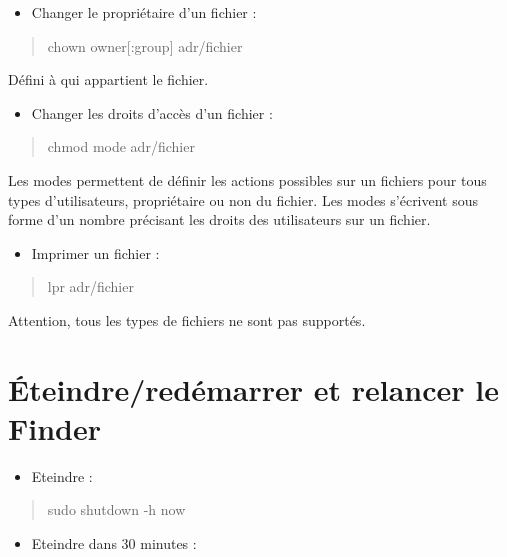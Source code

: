 \begin{itemize}
\tightlist
\item
  Changer le propriétaire d'un fichier :
\end{itemize}

\begin{quote}
chown owner{[}:group{]} adr/fichier
\end{quote}

Défini à qui appartient le fichier.

\begin{itemize}
\tightlist
\item
  Changer les droits d'accès d'un fichier :
\end{itemize}

\begin{quote}
chmod mode adr/fichier
\end{quote}

Les modes permettent de définir les actions possibles sur un fichiers
pour tous types d'utilisateurs, propriétaire ou non du fichier. Les
modes s'écrivent sous forme d'un nombre précisant les droits des
utilisateurs sur un fichier.

\begin{itemize}
\tightlist
\item
  Imprimer un fichier :
\end{itemize}

\begin{quote}
lpr adr/fichier
\end{quote}

Attention, tous les types de fichiers ne sont pas supportés.

\section{Éteindre/redémarrer et relancer le
Finder}\label{uxe9teindrereduxe9marrer-et-relancer-le-finder}

\begin{itemize}
\tightlist
\item
  Eteindre :
\end{itemize}

\begin{quote}
sudo shutdown -h now
\end{quote}

\begin{itemize}
\tightlist
\item
  Eteindre dans 30 minutes :
\end{itemize}

